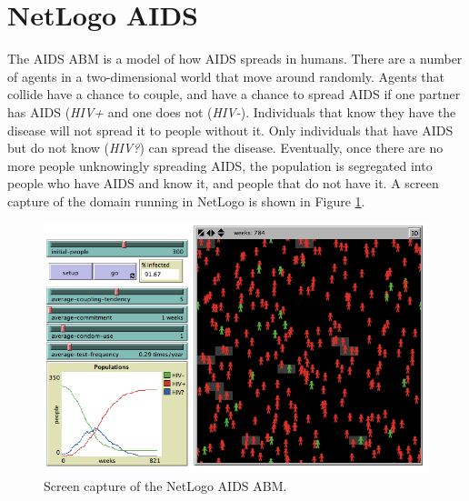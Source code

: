 
\section{NetLogo AIDS}

The AIDS ABM is a model of how AIDS spreads in humans.
There are a number of agents in a two-dimensional world that move around randomly.
Agents that collide have a chance to couple, and have a chance to spread AIDS if one partner has AIDS (\textit{HIV+} and one does not (\textit{HIV-}).
Individuals that know they have the disease will not spread it to people without it.
Only individuals that have AIDS but do not know (\textit{HIV?}) can spread the disease.
Eventually, once there are no more people unknowingly spreading AIDS, the population is segregated into people who have AIDS and know it, and people that do not have it.
A screen capture of the domain running in NetLogo is shown in Figure \ref{fig:aidsss}.

\begin{figure}[ht]
\centering
\includegraphics[scale=.5]{images/aids_ss.png}
\caption{Screen capture of the NetLogo AIDS ABM.}
\label{fig:aidsss}
\end{figure}

